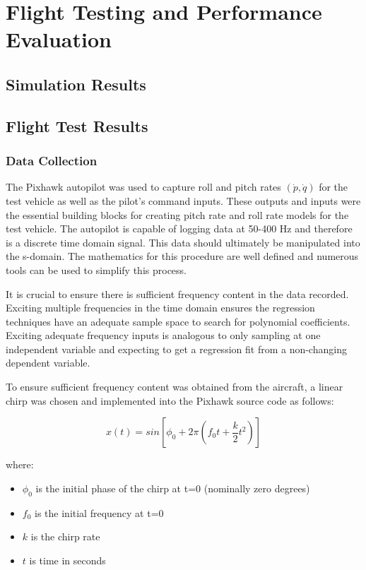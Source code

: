 \chapter{Flight Testing and Performance Evaluation}\label{ch:performance}

\section{Simulation Results}

\section{Flight Test Results}

\subsection{Data Collection}
The Pixhawk autopilot was used to capture roll and pitch rates $(\dot{p},\dot{q})$ for the test vehicle as well as the pilot's command inputs.  These outputs and inputs were the essential building blocks for creating pitch rate and roll rate models for the test vehicle.  The autopilot is capable of logging data at 50-400 Hz and therefore is a discrete time domain signal.  This data should ultimately be manipulated into the s-domain.  The mathematics for this procedure are well defined and numerous tools can be used to simplify this process.  

It is crucial to ensure there is sufficient frequency content in the data recorded.  Exciting multiple frequencies in the time domain ensures the regression techniques have an adequate sample space to search for polynomial coefficients.  Exciting adequate frequency inputs is analogous to only sampling at one independent variable and expecting to get a regression fit from a non-changing dependent variable.  

To ensure sufficient frequency content was obtained from the aircraft, a linear chirp was chosen and implemented into the Pixhawk source code as follows:

\begin{equation}
x(t)=sin\left[\phi_0+2\pi\left(f_0t+\frac{k}{2}t^2\right)\right]
\end{equation}

where:
\begin{itemize}
	\item[] $\phi_0$ is the initial phase of the chirp at t=0 (nominally zero degrees)
	\item[] $f_0$ is the initial frequency at t=0
	\item[] $k$ is the chirp rate
	\item[] $t$  is time in seconds
\end{itemize}

